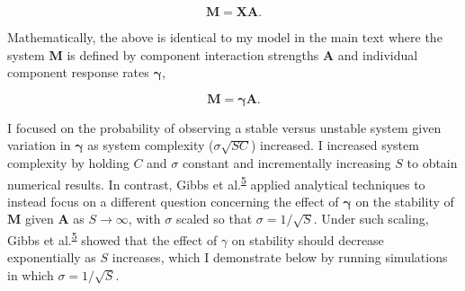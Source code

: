 \documentclass[]{article}
\begin{document}
\[\mathbf{M} = \mathbf{XA}.\]

Mathematically, the above is identical to my model in the main text
where the system \(\mathbf{M}\) is defined by component interaction
strengths \(\mathbf{A}\) and individual component response rates
\(\mathbf{\gamma}\),

\[\mathbf{M} = \mathbf{\gamma A}.\]

I focused on the probability of observing a stable versus unstable
system given variation in \(\mathbf{\gamma}\) as system complexity
(\(\sigma\sqrt{SC}\)) increased. I increased system complexity by
holding \(C\) and \(\sigma\) constant and incrementally increasing \(S\)
to obtain numerical results. In contrast, Gibbs et
al.\textsuperscript{\protect\hyperlink{ref-Gibbs2017}{5}} applied
analytical techniques to instead focus on a different question
concerning the effect of \(\mathbf{\gamma}\) on the stability of
\(\mathbf{M}\) given \(\mathbf{A}\) as \(S \to \infty\), with \(\sigma\)
scaled so that \(\sigma = 1/\sqrt{S}\). Under such scaling, Gibbs et
al.\textsuperscript{\protect\hyperlink{ref-Gibbs2017}{5}} showed that
the effect of \(\gamma\) on stability should decrease exponentially as
\(S\) increases, which I demonstrate below by running simulations in
which \(\sigma = 1/\sqrt{S}\).
\end{document}
